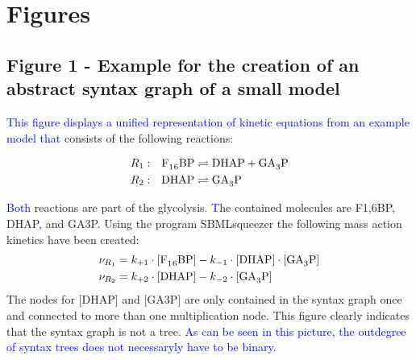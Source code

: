 \documentclass[10pt]{bmc_article}
\newenvironment{bmcformat}{\fussy\setboolean{publ}{true}}{\fussy}
\newcommand{\COR}[1]{\textcolor{blue}{#1}}
\begin{document}
\begin{bmcformat}
\newpage
{
   }     %





\section*{Figures}

\subsection*{Figure 1 - Example for the creation of an abstract syntax graph of a small model}
\COR{This figure displays a unified representation of kinetic equations from an example model that} consists of the following reactions:
\begin{center}
\parbox[c]{.35\textwidth}{\begin{align*}
R_{1}&:& \ce{F1,6BP} &\rightleftharpoons \ce{DHAP + GA3P}\\
R_{2}&:& \ce{DHAP}   &\rightleftharpoons \ce{GA3P}
\end{align*}}
\end{center}
\COR{Both} reactions are part of the glycolysis\COR{. T}he contained molecules are \acf{F1,6BP},
\acf{DHAP}\COR{,} and \acf{GA3P}.
Using the program SBMLsqueezer \cite{Draeger2008} the following mass action kinetics have been created:
\begin{align*}
\nu_{R_{1}} &= k_{+1} \cdot [\ce{F1,6BP}] - k_{-1} \cdot[\ce{DHAP}] \cdot [\ce{GA3P}]\\
\nu_{R_{2}} &= k_{+2} \cdot [\ce{DHAP}]   - k_{-2} \cdot[\ce{GA3P}]
\end{align*}
The nodes for [DHAP] and [GA3P] are only contained in the syntax graph once and connected to more than one multiplication node.
This figure clearly indicates that the syntax graph is not a tree.
\COR{As can be seen in this picture, the outdegree of syntax trees does not necessaryly have to be binary.}


\end{bmcformat}
\end{document}
